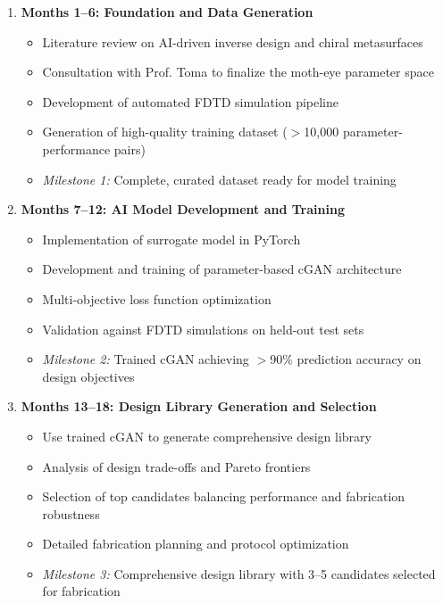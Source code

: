 \documentclass[12pt,a4paper]{article}
\begin{document}
\begin{enumerate}
  \item \textbf{Months 1--6: Foundation and Data Generation}
  \begin{itemize}
    \item Literature review on AI-driven inverse design and chiral metasurfaces
    \item Consultation with Prof. Toma to finalize the moth-eye parameter space
    \item Development of automated FDTD simulation pipeline
    \item Generation of high-quality training dataset ($>$10,000 parameter-performance pairs)
    \item \textit{Milestone 1:} Complete, curated dataset ready for model training
  \end{itemize}

  \item \textbf{Months 7--12: AI Model Development and Training}
  \begin{itemize}
    \item Implementation of surrogate model in PyTorch
    \item Development and training of parameter-based cGAN architecture
    \item Multi-objective loss function optimization
    \item Validation against FDTD simulations on held-out test sets
    \item \textit{Milestone 2:} Trained cGAN achieving $>$90\% prediction accuracy on design objectives
  \end{itemize}

  \item \textbf{Months 13--18: Design Library Generation and Selection}
  \begin{itemize}
    \item Use trained cGAN to generate comprehensive design library
    \item Analysis of design trade-offs and Pareto frontiers
    \item Selection of top candidates balancing performance and fabrication robustness
    \item Detailed fabrication planning and protocol optimization
    \item \textit{Milestone 3:} Comprehensive design library with 3--5 candidates selected for fabrication
  \end{itemize}


\end{enumerate}
\end{document}
